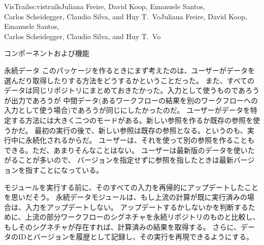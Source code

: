 \begin{aosachaptertoc}{VisTrails}{s:vistrails}{Juliana Freire, David Koop, Emanuele Santos, \\ Carlos Scheidegger, Claudio Silva, and Huy T.\ Vo}{Juliana Freire, David Koop, Emanuele Santos, \\ \hspace*{0.9cm} Carlos Scheidegger, Claudio Silva, and Huy T.\ Vo}
\begin{aosasect1}{コンポーネントおよび機能}
\begin{aosasect2}{永続データ}
このパッケージを作るときにまず考えたのは、ユーザーがデータを選んだり取得したりする方法をどうするかということだった。
また、すべてのデータは同じリポジトリにまとめておきたかった。入力として使うものであろうが出力であろうが
中間データ(あるワークフローの結果を別のワークフローへの入力として使う場合)であろうが同じにしたかったのだ。
ユーザーがデータを特定する方法には大きく二つのモードがある。新しい参照を作るか既存の参照を使うかだ。
最初の実行の後で、新しい参照は既存の参照となる。というのも、実行中に永続化されるからだ。
ユーザーは、それを使って別の参照を作ることもできる。ただ、あまりそんなことはない。
ユーザーは最新版のデータを使いたがることが多いので、
バージョンを指定せずに参照を指したときは最新バージョンを指すことになっている。

モジュールを実行する前に、そのすべての入力を再帰的にアップデートしたことを思いだそう。
永続データモジュールは、もし上流の計算が既に実行済みの場合は、入力をアップデートしない。
アップデートするかしないかを判断するために、上流の部分ワークフローのシグネチャを永続リポジトリのものと比較し、
もしそのシグネチャが存在すれば、計算済みの結果を取得する。
さらに、データのIDとバージョンを履歴として記録し、その実行を再現できるようにする。

\end{aosasect2}


\end{aosasect1}
\end{aosachaptertoc}
